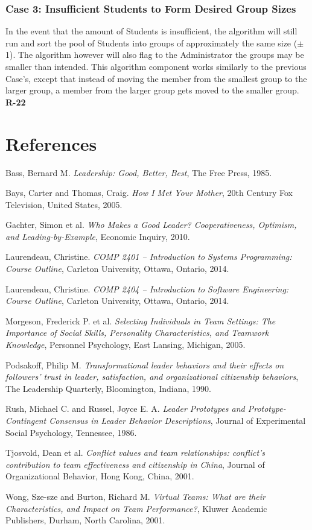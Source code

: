 \documentclass[12pt,letterpaper]{article}
\begin{document}
\subsubsection{Case 3: Insufficient Students to Form Desired Group Sizes}

In the event that the amount of Students is insufficient, the algorithm will still run and sort the pool of Students into groups of approximately the same size ($\pm$ 1). The algorithm however will also flag to the Administrator the groups may be smaller than intended. This algorithm component works similarly to the previous Case's, except that instead of moving the member from the smallest group to the larger group, a member from the larger group gets moved to the smaller group. {\bf R-22}

\renewcommand\refname{\vskip -1cm}
\section{References}

\begin{thebibliography}{16}
Bass, Bernard M.
{\it Leadership: Good, Better, Best},
The Free Press, 1985.

Bays, Carter and Thomas, Craig.
{\it How I Met Your Mother},
20th Century Fox Television, United States, 2005.

Gachter, Simon et al.
{\it Who Makes a Good Leader? Cooperativeness, Optimism, and Leading-by-Example},
Economic Inquiry, 2010.

Laurendeau, Christine.
{\it COMP 2401 -- Introduction to Systems Programming: Course Outline},
Carleton University, Ottawa, Ontario, 2014.

Laurendeau, Christine.
{\it COMP 2404 -- Introduction to Software Engineering: Course Outline},
Carleton University, Ottawa, Ontario, 2014.

Morgeson, Frederick P. et al.
{\it Selecting Individuals in Team Settings: The Importance of Social Skills, Personality Characteristics, and Teamwork Knowledge},
Personnel Psychology, East Lansing, Michigan, 2005.

Podsakoff, Philip M.
{\it Transformational leader behaviors and their effects on followers' trust in leader, satisfaction, and organizational citizenship behaviors},
The Leadership Quarterly, Bloomington, Indiana, 1990.

Rush, Michael C. and Russel, Joyce E. A.
{\it Leader Prototypes and Prototype-Contingent Consensus in Leader Behavior Descriptions},
Journal of Experimental Social Psychology, Tennessee, 1986.

Tjosvold, Dean et al.
{\it Conflict values and team relationships: conflict's contribution to team effectiveness and citizenship in China},
Journal of Organizational Behavior, Hong Kong, China, 2001.

Wong, Sze-sze and Burton, Richard M.
{\it Virtual Teams: What are their Characteristics, and Impact on Team Performance?},
Kluwer Academic Publishers, Durham, North Carolina, 2001.

\end{thebibliography}
\end{document}
